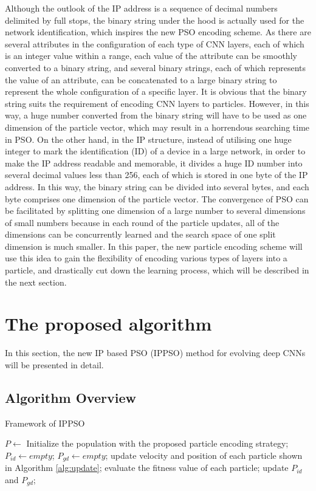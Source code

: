 \documentclass[conference]{IEEEtran}
\begin{document}
Although the outlook of the IP address is a sequence of decimal numbers delimited by full stops, the binary string under the hood is actually used for the network identification, which inspires the new PSO encoding scheme. As there are several attributes in the configuration of each type of CNN layers, each of which is an integer value within a range, each value of the attribute can be smoothly converted to a binary string, and several binary strings, each of which represents the value of an attribute, can be concatenated to a large binary string to represent the whole configuration of a specific layer. It is obvious that the binary string suits the requirement of encoding CNN layers to particles. However, in this way, a huge number converted from the binary string will have to be used as one dimension of the particle vector, which may result in a horrendous searching time in PSO. On the other hand, in the IP structure, instead of utilising one huge integer to mark the identification (ID) of a device in a large network, in order to make the IP address readable and memorable, it divides a huge ID number into several decimal values less than 256, each of which is stored in one byte of the IP address. In this way, the binary string can be divided into several bytes, and each byte comprises one dimension of the particle vector. The convergence of PSO can be facilitated by splitting one dimension of a large number to several dimensions of small numbers because in each round of the particle updates, all of the dimensions can be concurrently learned and the search space of one split dimension is much smaller. In this paper, the new particle encoding scheme will use this idea to gain the flexibility of encoding various types of layers into a particle, and drastically cut down the learning process, which will be described in the next section.



\section{The proposed algorithm}\label{sec:ProposedAlgorithm}
In this section, the new IP based PSO (IPPSO) method for evolving deep CNNs will be presented in detail.


\subsection{Algorithm Overview}
\begin{algorithm}
	\caption{Framework of IPPSO}
	\label{alg:framework}
	\begin{algorithmic}
		\renewcommand{\algorithmicrequire}{\textbf{Input:}}
		\renewcommand{\algorithmicensure}{\textbf{Output:}}
		\STATE $P \leftarrow$ Initialize the population with the proposed particle encoding strategy;
		\STATE $P_{id} \leftarrow empty$;
		\STATE $P_{gd} \leftarrow empty$;
			\STATE update velocity and position of each particle shown in Algorithm \ref{alg:update};
			\STATE evaluate the fitness value of each particle;
			\STATE update $P_{id}$ and $P_{gd}$;
		\ENDWHILE
	\end{algorithmic}
\end{algorithm}
\end{document}
